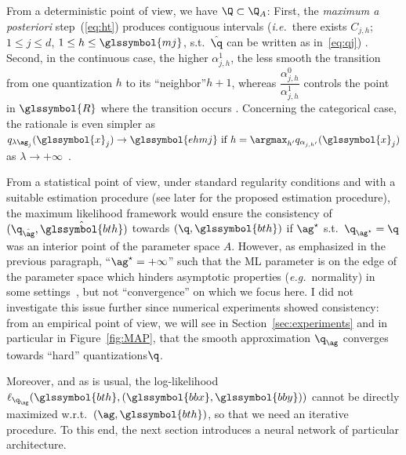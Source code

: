 From a deterministic point of view, we have $\Q \subset \Q_A$: First, the \textit{maximum a posteriori} step~(\ref{eq:ht}) produces contiguous intervals (\textit{i.e.}\ there exists $C_{j,h}$; $1 \leq j \leq d$, $1 \leq h \leq \glssymbol{mj}$, s.t.\ ${\hat{\q}}$ can be written as in~\ref{eq:qj}) \cite{same2011model}. Second, in the continuous case, the higher $\alpha_{j,h}^1$, the less smooth the transition from one quantization $h$ to its ``neighbor''\footnotemark[1] $h+1$, whereas $\dfrac{\alpha_{j,h}^0}{\alpha_{j,h}^1}$ controls the point in $\glssymbol{R}$ where the transition occurs \cite{chamroukhi2009regression}. Concerning the categorical case, the rationale is even simpler as $q_{\lambda \ag_j}(\glssymbol{x}_j) \to \glssymbol{ehmj} \text{ if } h = \argmax_{h'} q_{\alpha_{j,h'}}(\glssymbol{x}_j)$ as $\lambda \to +\infty$~\cite{reverdy2016parameter}.

From a statistical point of view, 
under standard regularity conditions and with a suitable estimation procedure (see later for the proposed estimation procedure), the maximum likelihood framework would ensure the consistency of $(\q_{\hat{\ag}}, \hat{\glssymbol{bth}})$ towards $(\q,\glssymbol{bth})$ if $\ag^\star$ s.t.\ $\q_{\ag^\star} = \q$ was an interior point of the parameter space $A$. However, as emphasized in the previous paragraph, ``$\ag^\star = + \infty$'' such that the ML parameter is on the edge of the parameter space which hinders asymptotic properties (\textit{e.g.}\ normality) in some settings~\cite{10.2307/2289471}, but not ``convergence'' on which we focus here. I did not investigate this issue further since numerical experiments showed consistency: from an empirical point of view, we will see in Section~\ref{sec:experiments} and in particular in Figure~\ref{fig:MAP}, that the smooth approximation $\q_{\ag}$ converges towards ``hard'' quantizations\footnotemark[1] $\q$.

Moreover, and as is usual, the log-likelihood $\ell_{\q_{\ag}}(\glssymbol{bth},(\glssymbol{bbx},\glssymbol{bby}))$ cannot be directly maximized w.r.t.\ $(\ag,\glssymbol{bth})$, so that we need an iterative procedure. To this end, the next section introduces a neural network of particular architecture.


